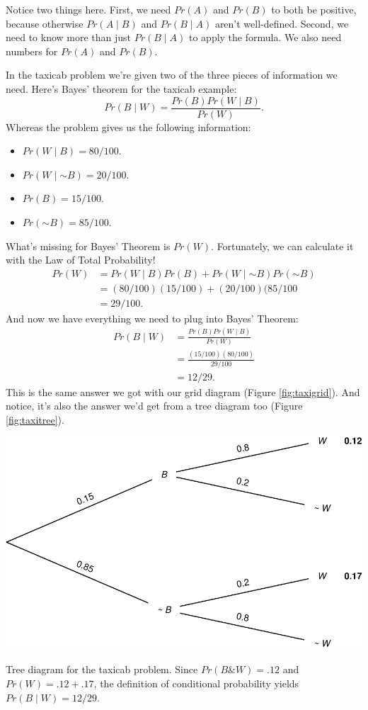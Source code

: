 \documentclass[justified]{tufte-book}
\providecommand{\tightlist}{%
  \setlength{\itemsep}{0pt}\setlength{\parskip}{0pt}}
\newcommand{\given}{\mid}
\renewcommand{\neg}{\mathbin{\sim}}
\renewcommand{\wedge}{\mathbin{\&}}
\newcommand{\p}{Pr}
\theoremstyle{definition}
\theoremstyle{definition}
\theoremstyle{definition}
\theoremstyle{remark}
\begin{document}
Notice two things here. First, we need \(\p(A)\) and \(\p(B)\) to both
be positive, because otherwise \(\p(A \given B)\) and \(\p(B \given A)\)
aren't well-defined. Second, we need to know more than just
\(\p(B \given A)\) to apply the formula. We also need numbers for
\(\p(A)\) and \(\p(B)\).

In the taxicab problem we're given two of the three pieces of
information we need. Here's Bayes' theorem for the taxicab example:
\[ \p(B \given W) = \frac{\p(B) \p(W \given B)}{\p(W)}. \] Whereas the
problem gives us the following information:

\begin{itemize}
\tightlist
\item
  \(\p(W \given B) = 80/100\).
\item
  \(\p(W \given \neg B) = 20/100\).
\item
  \(\p(B) = 15/100\).
\item
  \(\p(\neg B) = 85/100\).
\end{itemize}

What's missing for Bayes' Theorem is \(\p(W)\). Fortunately, we can
calculate it with the Law of Total Probability! \[
  \begin{aligned}
    \p(W) &= \p(W \given B)\p(B) + \p(W \given \neg B)\p(\neg B)\\
          &= (80/100)(15/100) + (20/100)(85/100\\
          &= 29/100.
  \end{aligned}
\] And now we have everything we need to plug into Bayes' Theorem: \[
  \begin{aligned}
    \p(B \given W) &= \frac{\p(B) \p(W \given B)}{\p(W)}\\
                   &= \frac{(15/100)(80/100)}{29/100}\\
                   &= 12/29.
  \end{aligned}
\] This is the same answer we got with our grid diagram (Figure
\ref{fig:taxigrid}). And notice, it's also the answer we'd get from a
tree diagram too (Figure \ref{fig:taxitree}).

\begin{marginfigure}
\includegraphics{_main_files/figure-latex/taxitree-1} \caption[Tree diagram for the taxicab problem]{Tree diagram for the taxicab problem. Since $\p(B \wedge W) = .12$ and $\p(W) = .12 + .17$, the definition of conditional probability yields $\p(B \given W) = 12/29$.}\label{fig:taxitree}
\end{marginfigure}
\end{document}
